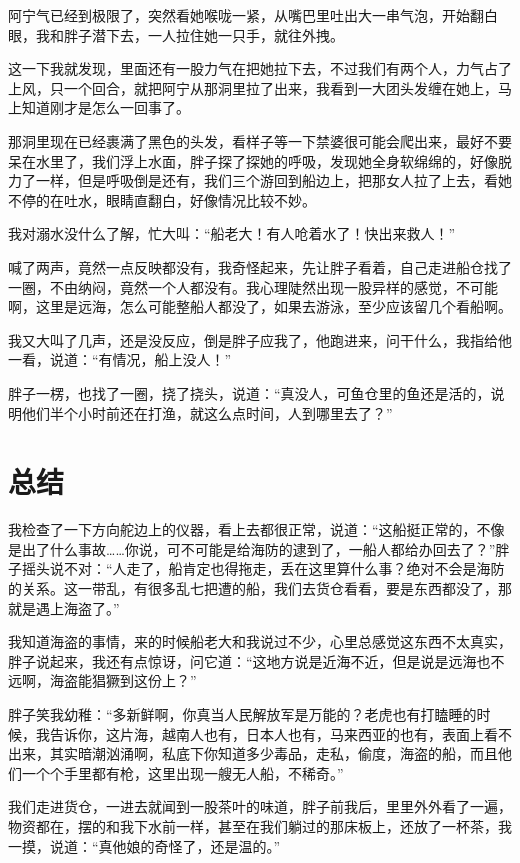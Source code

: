 阿宁气已经到极限了，突然看她喉咙一紧，从嘴巴里吐出大一串气泡，开始翻白眼，我和胖子潜下去，一人拉住她一只手，就往外拽。

这一下我就发现，里面还有一股力气在把她拉下去，不过我们有两个人，力气占了上风，只一个回合，就把阿宁从那洞里拉了出来，我看到一大团头发缠在她上，马上知道刚才是怎么一回事了。

那洞里现在已经裹满了黑色的头发，看样子等一下禁婆很可能会爬出来，最好不要呆在水里了，我们浮上水面，胖子探了探她的呼吸，发现她全身软绵绵的，好像脱力了一样，但是呼吸倒是还有，我们三个游回到船边上，把那女人拉了上去，看她不停的在吐水，眼睛直翻白，好像情况比较不妙。

我对溺水没什么了解，忙大叫：“船老大！有人呛着水了！快出来救人！”

喊了两声，竟然一点反映都没有，我奇怪起来，先让胖子看着，自己走进船仓找了一圈，不由纳闷，竟然一个人都没有。我心理陡然出现一股异样的感觉，不可能啊，这里是远海，怎么可能整船人都没了，如果去游泳，至少应该留几个看船啊。

我又大叫了几声，还是没反应，倒是胖子应我了，他跑进来，问干什么，我指给他一看，说道：“有情况，船上没人！”

胖子一楞，也找了一圈，挠了挠头，说道：“真没人，可鱼仓里的鱼还是活的，说明他们半个小时前还在打渔，就这么点时间，人到哪里去了？”

\chapter{总结}

我检查了一下方向舵边上的仪器，看上去都很正常，说道：“这船挺正常的，不像是出了什么事故……你说，可不可能是给海防的逮到了，一船人都给办回去了？”胖子摇头说不对：“人走了，船肯定也得拖走，丢在这里算什么事？绝对不会是海防的关系。这一带乱，有很多乱七把遭的船，我们去货仓看看，要是东西都没了，那就是遇上海盗了。”

我知道海盗的事情，来的时候船老大和我说过不少，心里总感觉这东西不太真实，胖子说起来，我还有点惊讶，问它道：“这地方说是近海不近，但是说是远海也不远啊，海盗能猖獗到这份上？”

胖子笑我幼稚：“多新鲜啊，你真当人民解放军是万能的？老虎也有打瞌睡的时候，我告诉你，这片海，越南人也有，日本人也有，马来西亚的也有，表面上看不出来，其实暗潮汹涌啊，私底下你知道多少毒品，走私，偷度，海盗的船，而且他们一个个手里都有枪，这里出现一艘无人船，不稀奇。”

我们走进货仓，一进去就闻到一股茶叶的味道，胖子前我后，里里外外看了一遍，物资都在，摆的和我下水前一样，甚至在我们躺过的那床板上，还放了一杯茶，我一摸，说道：“真他娘的奇怪了，还是温的。”

